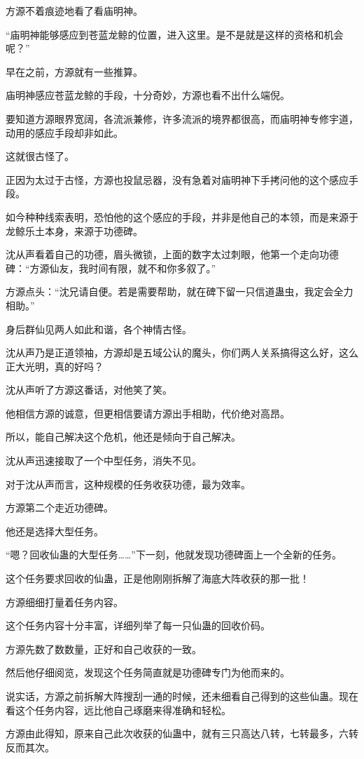 \begin{this_body}
方源不着痕迹地看了看庙明神。

“庙明神能够感应到苍蓝龙鲸的位置，进入这里。是不是就是这样的资格和机会呢？”

早在之前，方源就有一些推算。

庙明神感应苍蓝龙鲸的手段，十分奇妙，方源也看不出什么端倪。

要知道方源眼界宽阔，各流派兼修，许多流派的境界都很高，而庙明神专修宇道，动用的感应手段却非如此。

这就很古怪了。

正因为太过于古怪，方源也投鼠忌器，没有急着对庙明神下手拷问他的这个感应手段。

如今种种线索表明，恐怕他的这个感应的手段，并非是他自己的本领，而是来源于龙鲸乐土本身，来源于功德碑。

沈从声看着自己的功德，眉头微锁，上面的数字太过刺眼，他第一个走向功德碑：“方源仙友，我时间有限，就不和你多叙了。”

方源点头：“沈兄请自便。若是需要帮助，就在碑下留一只信道蛊虫，我定会全力相助。”

身后群仙见两人如此和谐，各个神情古怪。

沈从声乃是正道领袖，方源却是五域公认的魔头，你们两人关系搞得这么好，这么正大光明，真的好吗？

沈从声听了方源这番话，对他笑了笑。

他相信方源的诚意，但更相信要请方源出手相助，代价绝对高昂。

所以，能自己解决这个危机，他还是倾向于自己解决。

沈从声迅速接取了一个中型任务，消失不见。

对于沈从声而言，这种规模的任务收获功德，最为效率。

方源第二个走近功德碑。

他还是选择大型任务。

“嗯？回收仙蛊的大型任务……”下一刻，他就发现功德碑面上一个全新的任务。

这个任务要求回收的仙蛊，正是他刚刚拆解了海底大阵收获的那一批！

方源细细打量着任务内容。

这个任务内容十分丰富，详细列举了每一只仙蛊的回收价码。

方源先数了数数量，正好和自己收获的一致。

然后他仔细阅览，发现这个任务简直就是功德碑专门为他而来的。

说实话，方源之前拆解大阵搜刮一通的时候，还未细看自己得到的这些仙蛊。现在看这个任务内容，远比他自己琢磨来得准确和轻松。

方源由此得知，原来自己此次收获的仙蛊中，就有三只高达八转，七转最多，六转反而其次。


\end{this_body}
